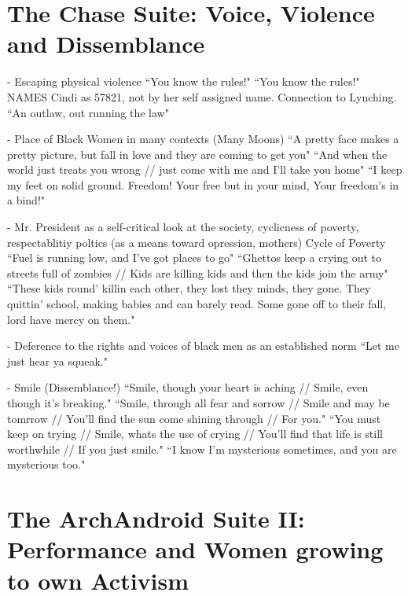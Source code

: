 \documentclass[a4paper, 11pt]{article} %
\begin{document}

\section*{The Chase Suite: Voice, Violence and Dissemblance}
- Escaping physical violence
``You know the rules!"\cite{wolfmasters}
``You know the rules!"\cite{happyhunting}
NAMES Cindi as 57821, not by her self assigned name. 
Connection to Lynching.
``An outlaw, out running the law"\cite{neonvalleystreet}

- Place of Black Women in many contexts (Many Moons)
``A pretty face makes a pretty picture, but fall in love and they are coming to get you"\cite{happyhunting}
``And when the world just treats you wrong // just come with me and I'll take you home" \cite{manymoons}
``I keep my feet on solid ground. Freedom! Your free but in your mind, Your freedom's in a bind!"\cite{manymoons}


- Mr. President as a self-critical look at the society, cyclicness of poverty, respectablitiy poltics (as a means toward opression, mothers)
Cycle of Poverty
``Fuel is running low, and I've got places to go"\cite{mrpresident}
``Ghettos keep a crying out to streets full of zombies // Kids are killing kids and then the kids join the army"\cite{danceordie}
``These kids round' killin each other, they lost they minds, they gone. They quittin' school, making babies and can barely read. Some gone off to their fall, lord have mercy on them."\cite{sincerelyjane}

- Deference to the rights and voices of black men as an established norm
``Let me just hear ya squeak."\cite{happyhunting}


- Smile (Dissemblance!)
``Smile, though your heart is aching // Smile, even though it's breaking."\cite{smile}
``Smile, through all fear and sorrow // Smile and may be tomrrow // You'll find the sun come shining through // For you."\cite{smile}
``You must keep on trying // Smile, whats the use of crying // You'll find that life is still worthwhile // If you just smile."\cite{smile}
``I know I'm mysterious sometimes, and you are mysterious too."\cite{primetime}


\section*{The ArchAndroid Suite II: Performance and Women growing to own Activism}
\end{document}
